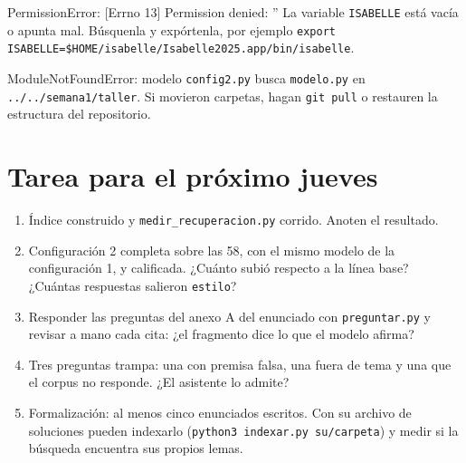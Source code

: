 \documentclass[11pt,a4paper]{article}
\newcommand{\cd}[1]{\texttt{\small #1}}
\begin{document}
\begin{falla}{PermissionError: [Errno 13] Permission denied: ''}
  La variable \cd{ISABELLE} está vacía o apunta mal. Búsquenla y expórtenla,
  por ejemplo \cd{export ISABELLE=\$HOME/isabelle/Isabelle2025.app/bin/isabelle}.
\end{falla}

\begin{falla}{ModuleNotFoundError: modelo}
  \cd{config2.py} busca \cd{modelo.py} en \cd{../../semana1/taller}. Si
  movieron carpetas, hagan \cd{git pull} o restauren la estructura del
  repositorio.
\end{falla}

\section{Tarea para el próximo jueves}

\begin{enumerate}
  \item Índice construido y \cd{medir\_recuperacion.py} corrido. Anoten el
    resultado.
  \item Configuración 2 completa sobre las 58, con el mismo modelo de la
    configuración 1, y calificada. ¿Cuánto subió respecto a la línea base?
    ¿Cuántas respuestas salieron \cd{estilo}?
  \item Responder las preguntas del anexo A del enunciado con
    \cd{preguntar.py} y revisar a mano cada cita: ¿el fragmento dice lo que
    el modelo afirma?
  \item Tres preguntas trampa: una con premisa falsa, una fuera de tema y
    una que el corpus no responde. ¿El asistente lo admite?
  \item Formalización: al menos cinco enunciados escritos. Con su archivo
    de soluciones pueden indexarlo (\cd{python3 indexar.py su/carpeta}) y
    medir si la búsqueda encuentra sus propios lemas.
\end{enumerate}
\end{document}
